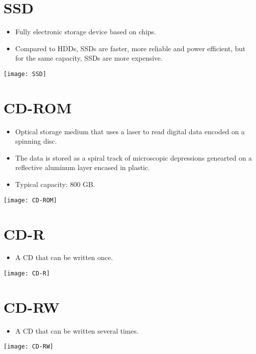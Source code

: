 \section{\gls{SSD}}
\begin{itemize}
\item Fully electronic storage device based on  chips.
\item Compared to \gls{HDD}s, \gls{SSD}s are faster, more reliable and
  power efficient, but for the same capacity, \gls{SSD}s are more
  expensive.
\end{itemize}
\vspace{-4ex}
\begin{center}
  \texttt{[image: SSD]}
\end{center}

\section{\gls{CD-ROM}}
\begin{itemize}
\item Optical storage medium that uses a laser to read digital data
  encoded on a spinning disc.
\item The data is stored as a spiral track of microscopic depressions
  genearted on a reflective aluminum layer encased in plastic.
\item Typical capacity: 800 GB.
\end{itemize}
\vspace{-4ex}
\begin{center}
  \texttt{[image: CD-ROM]}
\end{center}
  
\section{\gls{CD-R}}
\begin{itemize}
\item A \gls{CD} that can be written once.
\end{itemize}
\vspace{-4ex}
\begin{center}
  \texttt{[image: CD-R]}
\end{center}

\section{\gls{CD-RW}}
\begin{itemize}
\item A \gls{CD} that can be written several times.
\end{itemize}
\vspace{-4ex}
\begin{center}
  \texttt{[image: CD-RW]}
\end{center}


